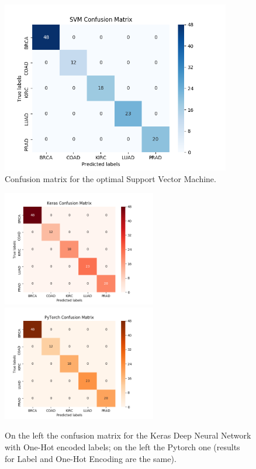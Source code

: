 \documentclass[12pt]{article}
\begin{document}
\begin{itemize}
\begin{figure}[h!]
\centering
\includegraphics[width=100mm]{img/svm.png}
\caption{Confusion matrix for the optimal Support Vector Machine.}
\label{fig_svm}
\end{figure}

\begin{figure}
\centering
\advance\leftskip-4cm
\advance\rightskip-4cm
\includegraphics[width=0.60\textwidth]{img/keras.png}
\includegraphics[width=0.60\textwidth]{img/pytorch.png} 
\caption{On the left the confusion matrix for the Keras Deep Neural Network with One-Hot encoded labels; on the left the Pytorch one (results for Label and One-Hot Encoding are the same).}
\label{fig_deep}
\end{figure}


\end{itemize}
\end{document}
